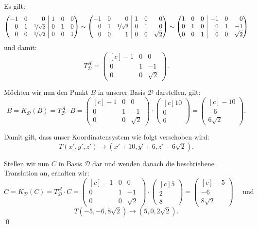 \documentclass[answers]{exam}
\makeatletter
\newenvironment{sysmatrix}[1]
  {\left(\begin{array}{@{}#1@{}}}
  {\end{array}\right)}
\newcommand{\vektor}[1]{\begin{pmatrix*}[c] #1 \end{pmatrix*}}
\makeatother
\begin{document}
\begin{questions}
\begin{parts}
\begin{solution}
            Es gilt:
            $$
                \begin{sysmatrix}{rrr|rrr}
                    -1 & 0 & 0 & 1 & 0 & 0 \\
                    0 & 1 & \nicefrac{1}{\sqrt{2}} & 0 & 1 & 0 \\
                    0 & 0 & \nicefrac{1}{\sqrt{2}} & 0 & 0 & 1
                \end{sysmatrix}
                \sim
                \begin{sysmatrix}{rrr|rrr}
                    -1 & 0 & 0 & 1 & 0 & 0 \\
                    0 & 1 & \nicefrac{1}{\sqrt{2}} & 0 & 1 & 0 \\
                    0 & 0 & 1 & 0 & 0 & \sqrt{2}
                \end{sysmatrix}
                \sim
                \begin{sysmatrix}{rrr|rrr}
                    1 & 0 & 0 & -1 & 0 & 0 \\
                    0 & 1 & 0 & 0 & 1 & -1 \\
                    0 & 0 & 1 & 0 & 0 & \sqrt{2}
                \end{sysmatrix}
            $$
            und damit:
            $$
                T^{\mathcal{A}}_{\mathcal{D}} = \vektor{-1 & 0 & 0 \\ 0 & 1 & -1 \\ 0 & 0 & \sqrt{2}}.
            $$

            Möchten wir nun den Punkt $B$ in unserer Basis $\mathcal{D}$ darstellen, gilt:
            $$
                B = K_{\mathcal{D}}(B) = T^{\mathcal{A}}_{\mathcal{D}} \cdot B = \vektor{-1 & 0 & 0 \\ 0 & 1 & -1 \\ 0 & 0 & \sqrt{2}} \cdot \vektor{10\\0\\6} = \vektor{-10 \\ -6 \\ 6\sqrt{2}}.
            $$

            Damit gilt, dass unser Koordinatensystem wie folgt verschoben wird:
            $$
                T(x', y', z') \to (x'+10, y'+6, z' - 6\sqrt{2}).
            $$

            Stellen wir nun $C$ in Basis $\mathcal{D}$ dar und wenden danach die beschriebene Translation an, erhalten wir:
            $$
                C = K_{\mathcal{D}}(C) = T^{\mathcal{A}}_{\mathcal{D}} \cdot C = \vektor{-1 & 0 & 0 \\ 0 & 1 & -1 \\ 0 & 0 & \sqrt{2}} \cdot \vektor{5\\2\\8} = \vektor{-5 \\ -6 \\ 8\sqrt{2}} \quad \text{ und }
            $$
            $$
                T(-5, -6, 8\sqrt{2}) \to (5, 0, 2\sqrt{2}).
            $$\qed
        \end{solution}


\end{parts}
\end{questions}
\end{document}
